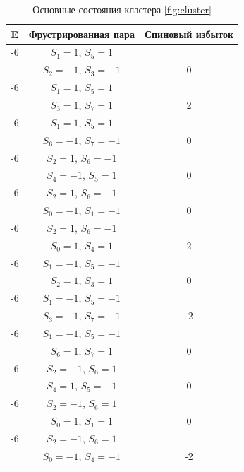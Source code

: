 \documentclass[utf8, babel, sor, jor, amsmath,amssymb, reprint]{elsarticle} %
\begin{document}
\begin{table}[h]
	\centering
	\begin{tabular}{|c|c|c|}
		\hline
		E   &   Фрустрированная пара & Спиновый избыток\\
		\hline
		-6   &  $S_1=1$, $S_5=1$ & \\
		      &    $S_2=-1$, $S_3=-1$ &0 \\
		 \hline
		 -6   &  $S_1=1$, $S_5=1$ &\\
		      &    $S_3=1$, $S_7=1$ & 2\\
		 \hline
		 -6   &  $S_1=1$, $S_5=1$ & \\
		      &    $S_6=-1$, $S_7=-1$ & 0\\
		 \hline
		-6   &  $S_2=1$, $S_6=-1$ & \\
				&    $S_4=-1$, $S_5=1$ & 0\\
		 \hline
		-6   &  $S_2=1$, $S_6=-1$ &\\
				&    $S_0=-1$, $S_1=-1$ & 0\\
		 \hline
		-6   &  $S_2=1$, $S_6=-1$ &\\
				&    $S_0=1$, $S_4=1$ & 2\\
		\hline
		-6   &  $S_1=-1$, $S_5=-1$ &\\
			&    $S_2=1$, $S_3=1$ & 0\\
		\hline
		-6   &  $S_1=-1$, $S_5=-1$ &\\
			&    $S_3=-1$, $S_7=-1$ & -2\\
		\hline
		-6   &  $S_1=-1$, $S_5=-1$ &\\
			&    $S_6=1$, $S_7=1$ & 0\\
		\hline
		-6   &  $S_2=-1$, $S_6=1$ &\\
			&    $S_4=1$, $S_5=-1$ & 0\\
		\hline
		-6   &  $S_2=-1$, $S_6=1$ &\\
			&    $S_0=1$, $S_1=1$ & 0\\
		\hline
		-6   &  $S_2=-1$, $S_6=1$ &\\
			&    $S_0=-1$, $S_4=-1$ & -2\\
		\hline
	\end{tabular}
	\caption{Основные состояния кластера \eqref{fig:cluster}}
	\label{tab:gs_cl}
\end{table}
\end{document}

